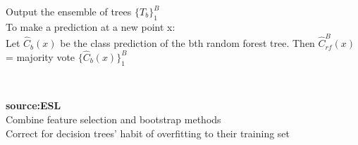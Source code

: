 \documentclass[xcolor={x11names,svgnames,dvipsnames}]{beamer}
\begin{document}
\begin{frame}
\begin{columns}
\begin{column}{.5\textwidth}
{\begin{algorithm}[H]
{{				         		    }				         		    
				         		    }
				         		    \nl Output the ensemble of trees $\{T_b\}_1^B$ \\
				         		    To make a prediction at a new point x:\\
				         		    \nl Let $\hat{C}_b(x)$ be the class prediction of the bth random forest tree. Then $\hat{C}_{rf}^B(x)$= majority vote $\{\hat{C}_b(x)\}_1^{B}$
			\end{algorithm} \\
				         		   }
		
	    \small{\textbf{source:ESL}}\\
	    \alert{\textbullet Combine feature selection and bootstrap methods}\\
	    \alert {\textbullet Correct for decision trees' habit of overfitting to their training set}
	\end{column}
\end{columns}	

\end{frame}
%
\end{document}
